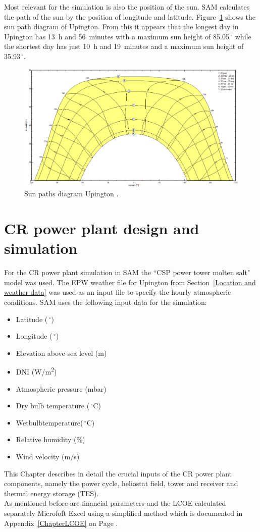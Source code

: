 \documentclass[Master,MEE,english]{twbook}%
\begin{document}
\newpage \noindent
Most relevant for the simulation is also the position of the sun. SAM calculates the path of the sun by the position of longitude and latitude. Figure~\ref{SunPathUpington} shows the sun path diagram of Upington. From this it appears that the longest day in Upington has 13~h and 56~minutes with a maximum sun height of 85.05$\,^{\circ}$ while the shortest day has just 10~h and 19~minutes and a maximum sun height of 35.93$\,^{\circ}$.
\begin{figure}[htbp]  
\centering
\includegraphics[width=0.95\linewidth]{FIG/SunPathUpington}
\caption[Sun paths diagram Upington.]{Sun paths diagram Upington \cite{PVsystSA2015}.}\label{SunPathUpington}
\end{figure}
\pagebreak 
\section{CR power plant design  and simulation}
For the CR power plant simulation in SAM the “CSP power tower molten salt" model was used. The EPW weather file for Upington from Section~\ref{Location and weather data} was used as an input file to specify the hourly atmospheric conditions. SAM uses the following input data for the simulation:
\begin{itemize}
\item Latitude ($\,^{\circ}$)
\item Longitude ($\,^{\circ}$)
\item Elevation above sea level (m)
\item DNI (W/m\textsuperscript{2})
\item Atmospheric pressure (mbar)
\item Dry bulb temperature ($\,^{\circ}\mathrm{C}$)
\item Wetbulbtemperature($\,^{\circ}\mathrm{C}$)
\item Relative humidity (\%)
\item Wind velocity (m/s)
\end{itemize}
This Chapter describes in detail the crucial inputs of the CR power plant components, namely the  power cycle, heliostat field, tower and receiver and thermal energy storage (TES).\\
As mentioned before are financial parameters and the LCOE calculated separately   Microfoft Excel using a simplified method which is documented in Appendix~\ref{ChapterLCOE} on Page \pageref{ChapterLCOE}. \\
\end{document}

